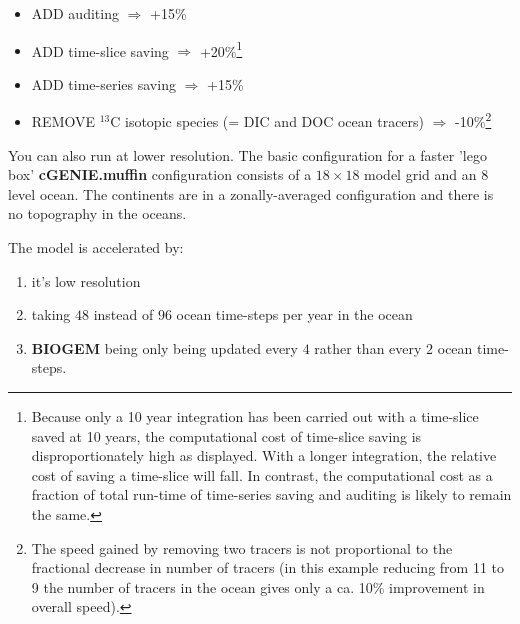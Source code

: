 \documentclass[11pt,fleqn]{book} %
\begin{document}
\begin{itemize}[noitemsep]
\setlength{\itemindent}{.2in}

\item   ADD auditing \begin{math}\Rightarrow\end{math} +15\%
\item   ADD time-slice saving   \begin{math}\Rightarrow\end{math} +20\%\footnote{Because only a 10 year integration has been carried out with a time-slice saved at 10 years, the computational cost of time-slice saving is disproportionately high as displayed. With a longer integration, the relative cost of saving a time-slice will fall. In contrast, the computational cost as a fraction of total run-time of time-series saving and auditing is likely to remain the same.}
\item   ADD time-series saving  \begin{math}\Rightarrow\end{math} +15\%
\item   REMOVE \begin{math}^{13}\end{math}C isotopic species (= DIC and DOC ocean tracers) \begin{math}\Rightarrow\end{math} -10\%\footnote{The speed gained by removing two tracers is not proportional to the fractional decrease in number of tracers (in this example reducing from 11 to 9 the number of tracers in the ocean gives only a ca. 10\% improvement in overall speed).}

\end{itemize}

\vspace{2mm}
You can also run at lower resolution. The basic configuration for a faster 'lego box' \textbf{cGENIE.muffin} configuration consists of a \(18\times 18\) model grid and an \(8\) level ocean. The continents are in a zonally-averaged configuration and there is no topography in the oceans.

The model is accelerated by:

\begin{enumerate}[noitemsep]
\setlength{\itemindent}{.2in}
\item it's low resolution
\item taking \(48\) instead of \(96\) ocean time-steps per year in the ocean
\item \textbf{BIOGEM} being only being updated every \(4\) rather than every \(2\) ocean time-steps.
\end{enumerate}
\end{document}
